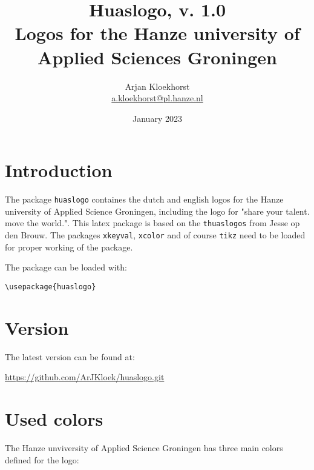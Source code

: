 \documentclass{ltxdoc}
\title{Huaslogo, v. 1.0\\
\large Logos for the Hanze university of Applied Sciences Groningen}
\author{Arjan Kloekhorst\\
\href{mailto:a.kloekhorst@pl.hanze.nkl}{a.kloekhorst@pl.hanze.nl}}
\date{January 2023}
\begin{document}
\setlength{\parindent}{0cm}

\maketitle

{\parskip=0pt \tableofcontents}
\newpage

\section{Introduction}
The package \verb|huaslogo| containes the dutch and english logos for the Hanze university of Applied Science Groningen, including the logo for "share your talent. move the world.". This latex package is based on the  \verb|thuaslogos| from Jesse op den Brouw. The packages \verb|xkeyval|, \verb|xcolor| and of course \verb|tikz| need to be loaded for proper working of the package.  
\par
The package can be loaded with:
\par
\verb|\usepackage{huaslogo}|
\par
\section{Version}
The latest version can be found at:
\par
\url{https://github.com/ArJKloek/huaslogo.git}
\section{Used colors}
The Hanze unviversity of Applied Science Groningen has three main colors defined for the logo: 
\par 
\end{document}
